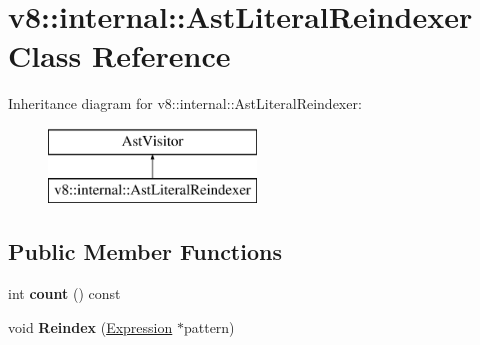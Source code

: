 \hypertarget{classv8_1_1internal_1_1_ast_literal_reindexer}{}\section{v8\+:\+:internal\+:\+:Ast\+Literal\+Reindexer Class Reference}
\label{classv8_1_1internal_1_1_ast_literal_reindexer}
Inheritance diagram for v8\+:\+:internal\+:\+:Ast\+Literal\+Reindexer\+:\begin{figure}[H]
\begin{center}
\leavevmode
\includegraphics[height=2.000000cm]{classv8_1_1internal_1_1_ast_literal_reindexer}
\end{center}
\end{figure}
\subsection*{Public Member Functions}
\begin{DoxyCompactItemize}
\item 
int {\bfseries count} () const \hypertarget{classv8_1_1internal_1_1_ast_literal_reindexer_a807d9e0544fa73c2d746b2ea793e0432}{}\label{classv8_1_1internal_1_1_ast_literal_reindexer_a807d9e0544fa73c2d746b2ea793e0432}

\item 
void {\bfseries Reindex} (\hyperlink{classv8_1_1internal_1_1_expression}{Expression} $\ast$pattern)\hypertarget{classv8_1_1internal_1_1_ast_literal_reindexer_a1aaa93eb134419a5922302e8eaddf967}{}\label{classv8_1_1internal_1_1_ast_literal_reindexer_a1aaa93eb134419a5922302e8eaddf967}

\end{DoxyCompactItemize}
